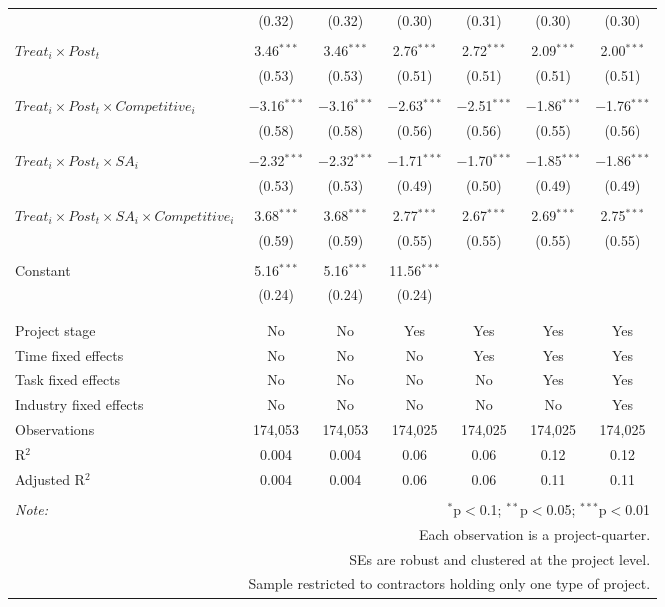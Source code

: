 \documentclass[
]{article}
\begin{document}
\begin{table}[H]
\begin{tabular}{@{\extracolsep{-3pt}}lcccccc}
  & (0.32) & (0.32) & (0.30) & (0.31) & (0.30) & (0.30) \\ 
  & & & & & & \\ 
 $Treat_i \times Post_t$ & 3.46$^{***}$ & 3.46$^{***}$ & 2.76$^{***}$ & 2.72$^{***}$ & 2.09$^{***}$ & 2.00$^{***}$ \\ 
  & (0.53) & (0.53) & (0.51) & (0.51) & (0.51) & (0.51) \\ 
  & & & & & & \\ 
 $Treat_i \times Post_t \times Competitive_i$ & $-$3.16$^{***}$ & $-$3.16$^{***}$ & $-$2.63$^{***}$ & $-$2.51$^{***}$ & $-$1.86$^{***}$ & $-$1.76$^{***}$ \\ 
  & (0.58) & (0.58) & (0.56) & (0.56) & (0.55) & (0.56) \\ 
  & & & & & & \\ 
 $Treat_i \times Post_t \times SA_i$ & $-$2.32$^{***}$ & $-$2.32$^{***}$ & $-$1.71$^{***}$ & $-$1.70$^{***}$ & $-$1.85$^{***}$ & $-$1.86$^{***}$ \\ 
  & (0.53) & (0.53) & (0.49) & (0.50) & (0.49) & (0.49) \\ 
  & & & & & & \\ 
 $Treat_i \times Post_t \times SA_i \times Competitive_i$ & 3.68$^{***}$ & 3.68$^{***}$ & 2.77$^{***}$ & 2.67$^{***}$ & 2.69$^{***}$ & 2.75$^{***}$ \\ 
  & (0.59) & (0.59) & (0.55) & (0.55) & (0.55) & (0.55) \\ 
  & & & & & & \\ 
 Constant & 5.16$^{***}$ & 5.16$^{***}$ & 11.56$^{***}$ &  &  &  \\ 
  & (0.24) & (0.24) & (0.24) &  &  &  \\ 
  & & & & & & \\ 
\hline \\[-1.8ex] 
Project stage & No & No & Yes & Yes & Yes & Yes \\ 
Time fixed effects & No & No & No & Yes & Yes & Yes \\ 
Task fixed effects & No & No & No & No & Yes & Yes \\ 
Industry fixed effects & No & No & No & No & No & Yes \\ 
Observations & 174,053 & 174,053 & 174,025 & 174,025 & 174,025 & 174,025 \\ 
R$^{2}$ & 0.004 & 0.004 & 0.06 & 0.06 & 0.12 & 0.12 \\ 
Adjusted R$^{2}$ & 0.004 & 0.004 & 0.06 & 0.06 & 0.11 & 0.11 \\ 
\hline 
\hline \\[-1.8ex] 
\textit{Note:}  & \multicolumn{6}{r}{$^{*}$p$<$0.1; $^{**}$p$<$0.05; $^{***}$p$<$0.01} \\ 
 & \multicolumn{6}{r}{Each observation is a project-quarter.} \\ 
 & \multicolumn{6}{r}{SEs are robust and clustered at the project level.} \\ 
 & \multicolumn{6}{r}{Sample restricted to contractors holding only one type of project.} \\ 
\end{tabular} 
\end{table}
\end{document}
